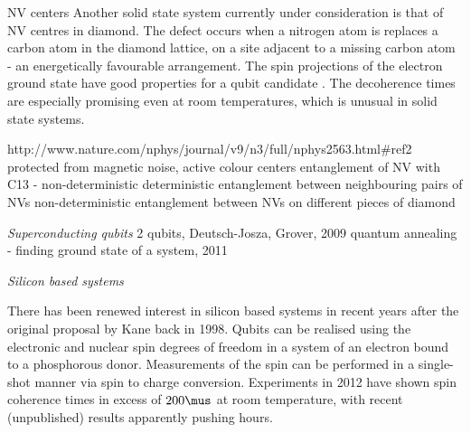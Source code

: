 NV centers 
Another solid state system currently under consideration is that of NV centres in diamond. The defect occurs when a nitrogen atom is replaces a carbon atom in the diamond lattice, on a site adjacent to a missing carbon atom - an energetically favourable arrangement. The spin projections of the electron ground state have good properties for a qubit candidate \cite{nv_review, nv_oscillation_04}. The decoherence times are especially promising even at room temperatures, which is unusual in solid state systems.


http://www.nature.com/nphys/journal/v9/n3/full/nphys2563.html#ref2
protected from magnetic noise, active colour centers
\cite{two_qubit_nv}
\cite{nv_entanglement_hanson} entanglement of NV with C13 - non-deterministic
\cite{nv_entanglement_wachtrup} deterministic entanglement between neighbouring pairs of NVs
\cite{remote_nv_entanglement_hanson} non-deterministic entanglement between NVs on different pieces of diamond

\textit{Superconducting qubits}
\cite{two_qubit_chip_yale} 2 qubits, Deutsch-Josza, Grover, 2009
\cite{dwave_annealing} quantum annealing - finding ground state of a system, 2011

\textit{Silicon based systems}

There has been renewed interest in silicon based systems in recent years after the original proposal by Kane back in 1998. Qubits can be realised using the electronic and nuclear spin degrees of freedom in a system of an electron bound to a phosphorous donor. Measurements of the spin can be performed in a single-shot manner via spin to charge conversion. Experiments in 2012 have shown spin coherence times in excess of $200\mus$ \cite{silicon_qubits, silicon_seconds} at room temperature, with recent (unpublished) results apparently pushing hours.

